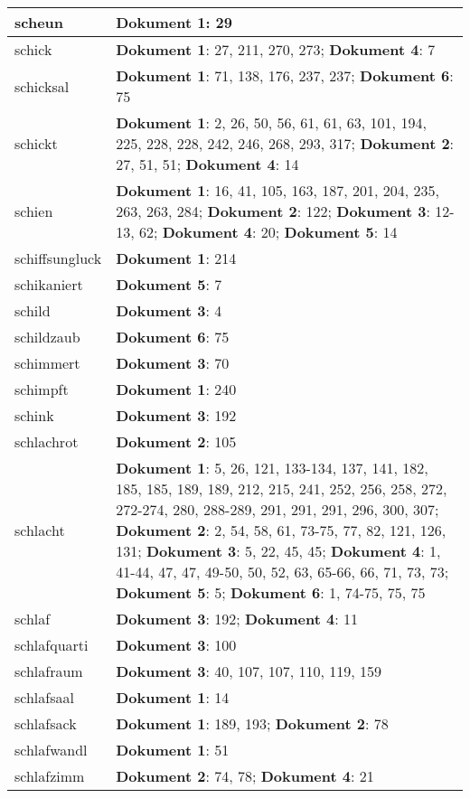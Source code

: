 \documentclass[a5paper]{article}
\begin{document}
\begin{longtable}[l]{|l|p{3in}|}
\hline
scheun & \textbf{Dokument 1}: 29 \\
\hline
schick & \textbf{Dokument 1}: 27, 211, 270, 273; \textbf{Dokument 4}: 7 \\
\hline
schicksal & \textbf{Dokument 1}: 71, 138, 176, 237, 237; \textbf{Dokument 6}: 75 \\
\hline
schickt & \textbf{Dokument 1}: 2, 26, 50, 56, 61, 61, 63, 101, 194, 225, 228, 228, 242, 246, 268, 293, 317; \textbf{Dokument 2}: 27, 51, 51; \textbf{Dokument 4}: 14 \\
\hline
schien & \textbf{Dokument 1}: 16, 41, 105, 163, 187, 201, 204, 235, 263, 263, 284; \textbf{Dokument 2}: 122; \textbf{Dokument 3}: 12-13, 62; \textbf{Dokument 4}: 20; \textbf{Dokument 5}: 14 \\
\hline
schiffsungluck & \textbf{Dokument 1}: 214 \\
\hline
schikaniert & \textbf{Dokument 5}: 7 \\
\hline
schild & \textbf{Dokument 3}: 4 \\
\hline
schildzaub & \textbf{Dokument 6}: 75 \\
\hline
schimmert & \textbf{Dokument 3}: 70 \\
\hline
schimpft & \textbf{Dokument 1}: 240 \\
\hline
schink & \textbf{Dokument 3}: 192 \\
\hline
schlachrot & \textbf{Dokument 2}: 105 \\
\hline
schlacht & \textbf{Dokument 1}: 5, 26, 121, 133-134, 137, 141, 182, 185, 185, 189, 189, 212, 215, 241, 252, 256, 258, 272, 272-274, 280, 288-289, 291, 291, 291, 296, 300, 307; \textbf{Dokument 2}: 2, 54, 58, 61, 73-75, 77, 82, 121, 126, 131; \textbf{Dokument 3}: 5, 22, 45, 45; \textbf{Dokument 4}: 1, 41-44, 47, 47, 49-50, 50, 52, 63, 65-66, 66, 71, 73, 73; \textbf{Dokument 5}: 5; \textbf{Dokument 6}: 1, 74-75, 75, 75 \\
\hline
schlaf & \textbf{Dokument 3}: 192; \textbf{Dokument 4}: 11 \\
\hline
schlafquarti & \textbf{Dokument 3}: 100 \\
\hline
schlafraum & \textbf{Dokument 3}: 40, 107, 107, 110, 119, 159 \\
\hline
schlafsaal & \textbf{Dokument 1}: 14 \\
\hline
schlafsack & \textbf{Dokument 1}: 189, 193; \textbf{Dokument 2}: 78 \\
\hline
schlafwandl & \textbf{Dokument 1}: 51 \\
\hline
schlafzimm & \textbf{Dokument 2}: 74, 78; \textbf{Dokument 4}: 21 \\

\end{longtable}
\end{document}
